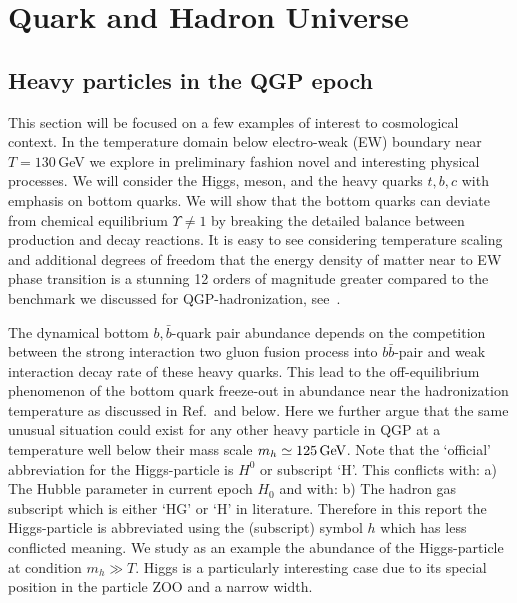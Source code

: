 \section{Quark and Hadron Universe}\label{part2}
\subsection{Heavy particles in the QGP epoch}
\label{HiggsQGP}
This section will be focused on a few examples of interest to cosmological context. In the temperature domain below electro-weak (EW) boundary near $T=130$\,GeV we explore in preliminary fashion novel and interesting physical processes. We will consider the Higgs, meson, and the heavy quarks $t,b,c$ with emphasis on bottom quarks. We will show that the bottom quarks can deviate from chemical equilibrium $\Upsilon\neq 1$ by breaking the detailed balance between production and decay reactions. It is easy to see considering temperature scaling and additional degrees of freedom that the energy density of matter near to EW phase transition is a stunning 12 orders of magnitude greater compared to the benchmark we discussed for QGP-hadronization, see~.
 
The dynamical bottom $ b,\bar b$-quark pair abundance depends on the competition between the strong interaction two gluon fusion process into $b\bar b$-pair and weak interaction decay rate of these heavy quarks. This lead to the off-equilibrium phenomenon of the bottom quark freeze-out in abundance near the hadronization temperature as discussed in Ref.\,\cite{Yang:2020nne} and below. Here we further argue that the same unusual situation could exist for any other heavy particle in QGP at a temperature well below their mass scale $m_h\simeq 125\text{\,GeV}$. {\color{black}Note that the `official' abbreviation for the Higgs-particle is $H^0$ or subscript `H'. This conflicts with: a) The Hubble parameter in current epoch $H_0$ and with: b) The hadron gas subscript which is either `HG' or `H' in literature. Therefore in this report the Higgs-particle is abbreviated using the (subscript) symbol $h$ which has less conflicted meaning.} We study as an example the abundance of the Higgs-particle at condition $m_h\gg T$. Higgs is a particularly interesting case due to its special position in the particle ZOO and a narrow width.

